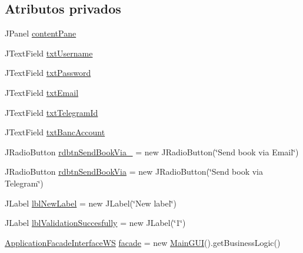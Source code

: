\subsection*{Atributos privados}
\begin{DoxyCompactItemize}
\item 
J\+Panel \mbox{\hyperlink{classgui_1_1_modify_account_g_u_i_a381fa9bf3fbd1dbbe3166aa501fab1fc}{content\+Pane}}
\item 
J\+Text\+Field \mbox{\hyperlink{classgui_1_1_modify_account_g_u_i_af8c1603f6af69f39c0d0a29a8aa2b568}{txt\+Username}}
\item 
J\+Text\+Field \mbox{\hyperlink{classgui_1_1_modify_account_g_u_i_a589fabddc834cc42a2acaa2ad904ae3f}{txt\+Password}}
\item 
J\+Text\+Field \mbox{\hyperlink{classgui_1_1_modify_account_g_u_i_a52839f2a7edd45f9c756f0012e4dc1d6}{txt\+Email}}
\item 
J\+Text\+Field \mbox{\hyperlink{classgui_1_1_modify_account_g_u_i_ab28de7ad0595e732310c6d55c763bf5d}{txt\+Telegram\+Id}}
\item 
J\+Text\+Field \mbox{\hyperlink{classgui_1_1_modify_account_g_u_i_a4ae8a0fdffbec7405e1baf27e485f768}{txt\+Banc\+Account}}
\item 
J\+Radio\+Button \mbox{\hyperlink{classgui_1_1_modify_account_g_u_i_aa53f8e44219679688600395a16df9c1f}{rdbtn\+Send\+Book\+Via\+\_}} = new J\+Radio\+Button(\char`\"{}Send book via Email\char`\"{})
\item 
J\+Radio\+Button \mbox{\hyperlink{classgui_1_1_modify_account_g_u_i_a77129e74749dc0b350d05de4f5137c52}{rdbtn\+Send\+Book\+Via}} = new J\+Radio\+Button(\char`\"{}Send book via Telegram\char`\"{})
\item 
J\+Label \mbox{\hyperlink{classgui_1_1_modify_account_g_u_i_a5df2167d933511b49e57a083d10f7cb7}{lbl\+New\+Label}} = new J\+Label(\char`\"{}New label\char`\"{})
\item 
J\+Label \mbox{\hyperlink{classgui_1_1_modify_account_g_u_i_a152e659fd97ffc8f00d87e437dbf53a8}{lbl\+Validation\+Succesfully}} = new J\+Label(\char`\"{}1\char`\"{})
\item 
\mbox{\hyperlink{interfacebusiness_logic_1_1_application_facade_interface_w_s}{Application\+Facade\+Interface\+WS}} \mbox{\hyperlink{classgui_1_1_modify_account_g_u_i_aaadd5325f9f2b8ac9cb5d4bbe848d5b8}{facade}} = new \mbox{\hyperlink{classgui_1_1_main_g_u_i}{Main\+G\+UI}}().get\+Business\+Logic()
\end{DoxyCompactItemize}


